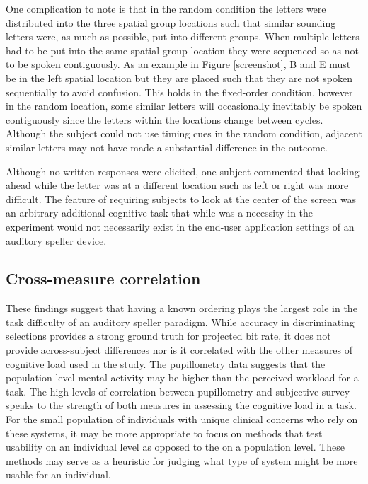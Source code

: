 \documentclass[10pt]{article}
\begin{document}
One complication to note is that in the random condition the
letters were distributed into the three spatial group
locations such that similar sounding letters were, as much as
possible, put into different groups. When multiple letters had
to be put into the same spatial group location they were
sequenced so as not to be spoken contiguously.  As an example
in Figure \ref{screenshot}, B and E must be in the left
spatial location but they are placed such that they are not
spoken sequentially to avoid confusion.  This holds in the
fixed-order condition, however in the random location, some
similar letters will occasionally inevitably be spoken contiguously since
the letters within the locations change between cycles.
Although the subject could not use timing cues in the
random condition, adjacent similar letters may not have made a substantial
difference in the outcome. 


Although no written responses were elicited, one subject commented that looking ahead while the letter was at a
different location such as left or right was more difficult.  The
feature of requiring subjects to look at the center of the screen
was an arbitrary additional cognitive task that while
was a necessity in the experiment would not necessarily exist in the
end-user application settings of an auditory speller device.

\subsection{Cross-measure correlation}

These findings suggest that having a known ordering plays the
largest role in the task difficulty of an auditory speller paradigm.
While accuracy in discriminating selections provides a strong ground
truth for projected bit rate, it does not provide across-subject
differences nor is it correlated with the other measures of
cognitive load used in the study.  The pupillometry data suggests
that the population level mental activity may be higher than the
perceived workload for a task. The high levels of correlation
between pupillometry and subjective survey speaks to the strength of
both measures in assessing the cognitive load in a task.  
For the small population of individuals with unique clinical concerns who rely on
these systems, it may be more appropriate to focus on methods that
test usability on an individual level as opposed to the on a
population level.  These methods may serve as a heuristic for judging what type of system
might be more usable for an individual.
\end{document}
